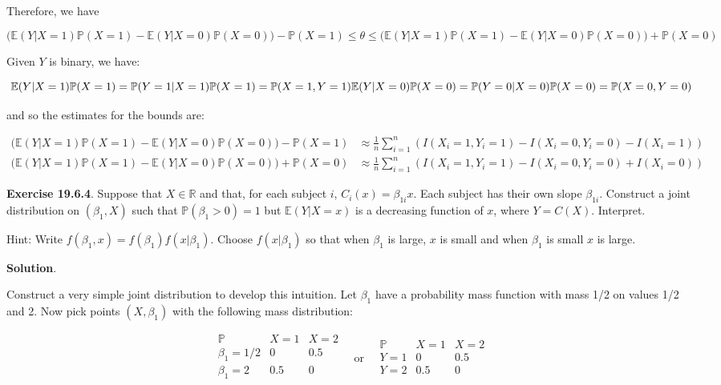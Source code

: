 Therefore, we have

\[ \Big( \mathbb{E}(Y | X = 1) \mathbb{P}(X = 1) - \mathbb{E}(Y | X = 0) \mathbb{P}(X = 0) \Big) - \mathbb{P}(X = 1)
 \leq \theta \leq
 \Big( \mathbb{E}(Y | X = 1) \mathbb{P}(X = 1) - \mathbb{E}(Y | X = 0) \mathbb{P}(X = 0) \Big) + \mathbb{P}(X = 0)
\]

Given \(Y\) is binary, we have:

\[ \mathbb{E}(Y | X = 1) \mathbb{P}(X = 1) =  \mathbb{P}(Y = 1 | X = 1) \mathbb{P}(X = 1) =  \mathbb{P}(X = 1, Y = 1) \\
\mathbb{E}(Y | X = 0) \mathbb{P}(X = 0) =  \mathbb{P}(Y = 0 | X = 0) \mathbb{P}(X = 0) =  \mathbb{P}(X = 0, Y = 0) \]

and so the estimates for the bounds are:

\begin{align*}
\Big( \mathbb{E}(Y | X = 1) \mathbb{P}(X = 1) - \mathbb{E}(Y | X = 0) \mathbb{P}(X = 0) \Big) - \mathbb{P}(X = 1)
&\approx \frac{1}{n} \sum_{i = 1}^{n} \left( I(X_{i} = 1, Y_{i} = 1) - I(X_{i} = 0, Y_{i} = 0) - I(X_{i} = 1)\right) \\
\Big( \mathbb{E}(Y | X = 1) \mathbb{P}(X = 1) - \mathbb{E}(Y | X = 0) \mathbb{P}(X = 0) \Big) + \mathbb{P}(X = 0)
&\approx \frac{1}{n} \sum_{i = 1}^{n} \left( I(X_{i} = 1, Y_{i} = 1) - I(X_{i} = 0, Y_{i} = 0) + I(X_{i} = 0)\right)
\end{align*}

\textbf{Exercise 19.6.4}. Suppose that \(X \in \mathbb{R}\) and that,
for each subject \(i\), \(C_{i}(x) = \beta_{1i}x\). Each subject has their
own slope \(\beta_{1i}\). Construct a joint distribution on
\((\beta_{1}, X)\) such that \(\mathbb{P}(\beta_{1} > 0) = 1\) but
\(\mathbb{E}(Y | X = x)\) is a decreasing function of \(x\), where
\(Y = C(X)\). Interpret.

Hint: Write \(f(\beta_{1}, x) = f(\beta_{1})f(x | \beta_{1})\). Choose
\(f(x | \beta_{1})\) so that when \(\beta_{1}\) is large, \(x\) is small and
when \(\beta_{1}\) is small \(x\) is large.

\textbf{Solution}.

Construct a very simple joint distribution to develop this
intuition. Let \(\beta_{1}\) have a probability mass function with mass
1/2 on values 1/2 and 2. Now  pick points \((X, \beta_{1})\) with the
following mass distribution:

\[\begin{array}{c|cc}
\mathbb{P} & X = 1 & X = 2 \\
\hline
\beta_{1} = 1/2 & 0 & 0.5 \\
\beta_{1} = 2 & 0.5 & 0 \\
\end{array}
\quad \text{or} \quad
\begin{array}{c|cc}
\mathbb{P} & X = 1 & X = 2 \\
\hline
Y = 1 & 0 & 0.5 \\
Y = 2 & 0.5 & 0 \\
\end{array}
\]

